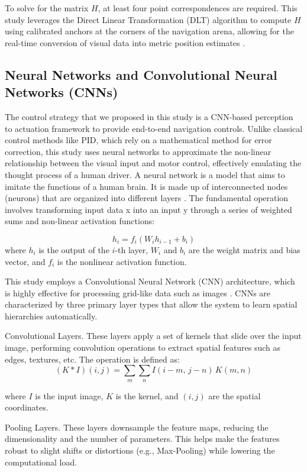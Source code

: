 To solve for the matrix $H$, at least four point correspondences are required. This study leverages the Direct Linear Transformation (DLT) algorithm to compute $H$ using calibrated anchors at the corners of the navigation arena, allowing for the real-time conversion of visual data into metric position estimates \citep{Szeliski2010ComputerVisionBook}.

\subsection{Neural Networks and Convolutional Neural Networks (CNNs)}
The control strategy that we proposed in this study is a CNN-based perception to actuation framework to provide end-to-end navigation controls. Unlike classical control methods like PID, which rely on a mathematical method for error correction, this study uses neural networks to approximate the non-linear relationship between the visual input and motor control, effectively emulating the thought process of a human driver. A neural network is a model that aims to imitate the functions of a human brain. It is made up of interconnected nodes (neurons) that are organized into different layers \citep{Goodfellow2016DeepLearning}. The fundamental operation involves transforming input data x into an input y through a series of weighted sums and non-linear activation functions:

\[
h_i = f_i\!\left(W_i h_{i-1} + b_i\right)
\]
where $h_i$ is the output of the $i$-th layer, $W_i$ and $b_i$
are the weight matrix and bias vector, and $f_i$ is the nonlinear
activation function.


This study employs a Convolutional Neural Network (CNN) architecture, which is highly effective for processing grid-like data such as images \citep{LeCun2015DeepLearningNature}. CNNs are characterized by three primary layer types that allow the system to learn spatial hierarchies automatically.

Convolutional Layers. These layers apply a set of kernels that slide over the input image, performing convolution operations to extract spatial features such as edges, textures, etc. The operation is defined as:
\[
(K * I)(i,j) =
\sum_{m}\sum_{n}
I(i - m,\, j - n)\, K(m,n)
\]

where $I$ is the input image, $K$ is the kernel, and $(i,j)$ are the
spatial coordinates.



Pooling Layers. These layers downsample the feature maps, reducing the dimensionality and the number of parameters. This helps make the features robust to slight shifts or distortions (e.g., Max-Pooling) while lowering the computational load.

